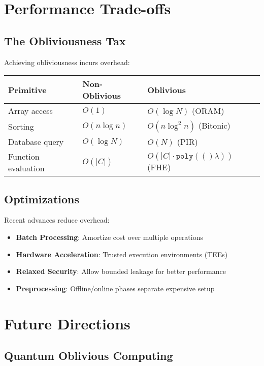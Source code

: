 \documentclass[11pt,final]{article}
\newcommand{\poly}[1]{\mathtt{poly}(#1)}
\begin{document}
\section{Performance Trade-offs}

\subsection{The Obliviousness Tax}

Achieving obliviousness incurs overhead:

\begin{center}
\begin{tabular}{lll}
\textbf{Primitive} & \textbf{Non-Oblivious} & \textbf{Oblivious} \\
\hline
Array access & $O(1)$ & $O(\log N)$ (ORAM) \\
Sorting & $O(n \log n)$ & $O(n \log^2 n)$ (Bitonic) \\
Database query & $O(\log N)$ & $O(N)$ (PIR) \\
Function evaluation & $O(|C|)$ & $O(|C| \cdot \poly(\lambda))$ (FHE) \\
\end{tabular}
\end{center}

\subsection{Optimizations}

Recent advances reduce overhead:
\begin{itemize}
    \item \textbf{Batch Processing}: Amortize cost over multiple operations
    \item \textbf{Hardware Acceleration}: Trusted execution environments (TEEs)
    \item \textbf{Relaxed Security}: Allow bounded leakage for better performance
    \item \textbf{Preprocessing}: Offline/online phases separate expensive setup
\end{itemize}

\section{Future Directions}

\subsection{Quantum Oblivious Computing}
\end{document}
